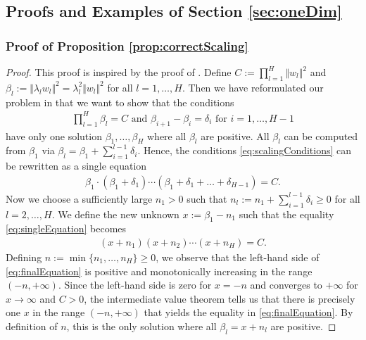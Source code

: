 \documentclass[twoside]{article}
\theoremstyle{definition}
\theoremstyle{remark}
\begin{document}
\subsection{Proofs and Examples of Section \ref{sec:oneDim}}

\subsubsection{Proof of Proposition \ref{prop:correctScaling}}
\begin{proof}
    This proof is inspired by the proof of \cite[Corollary~5.14]{kohn2022geometry}.
    Define $C := \prod_{l=1}^H \Vert w_l \Vert^2$
    and $\beta_l := \Vert \lambda_l w_l \Vert^2 = \lambda_l^2 \Vert w_l \Vert^2$ for all $l = 1, \ldots, H$.
    Then we have reformulated our problem in that we want to show that the conditions  
    \begin{align}\label{eq:scalingConditions}
        \prod_{l=1}^H \beta_l = C \text{ and }
        \beta_{i+1} - \beta_i = \delta_i \text{ for } i = 1, \ldots, H-1
    \end{align}
    have only one solution $\beta_1, \ldots, \beta_H$ where all $\beta_l$ are positive.
    All $\beta_l$ can be computed from $\beta_1$ via $\beta_l = \beta_1 + \sum_{i=1}^{l-1} \delta_i$. 
    Hence, the conditions \eqref{eq:scalingConditions} can be rewritten as a single equation
    \begin{align}\label{eq:singleEquation}
        \beta_1 \cdot (\beta_1 + \delta_1) \cdots (\beta_1 + \delta_1 + \ldots + \delta_{H-1}) = C.
    \end{align}
    Now we choose a sufficiently large $n_1 > 0$ such that $n_l := n_1 + \sum_{i=1}^{l-1} \delta_i \geq 0$ for all $l = 2, \ldots, H$.
    We define the new unknown $x := \beta_1 - n_1$ such that  the equality \eqref{eq:singleEquation} becomes
    \begin{align}
        \label{eq:finalEquation}
        (x+n_1) (x+n_2) \cdots (x+n_H) = C.
    \end{align}
     Defining $n := \min \{ n_1, \ldots, n_H \} \geq 0$, we observe that the left-hand side of \eqref{eq:finalEquation} is positive and monotonically increasing in the range $(-n, +\infty)$.
    Since the left-hand side is zero for $x=-n$ and converges to $+\infty$ for $x \to \infty$ and $C > 0$, the intermediate value theorem tells us that there is precisely one $x$ in the range $(-n, +\infty)$ that yields the equality in \eqref{eq:finalEquation}.
    By definition of $n$, this is the only solution where all $\beta_l = x+n_l$ are positive. 
\end{proof}
\end{document}
